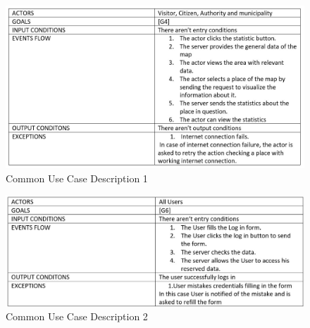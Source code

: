 \begin{figure}[h]
\centering
\includegraphics[width=\textwidth]{Images/common_use_case.png}
\caption{\label{fig:CUC}Common Use Case  Description 1} 
\end{figure}
\begin{figure}[h]
\centering
\includegraphics[width=\textwidth]{Images/common_use_case2.png}
\caption{\label{fig:CUC2}Common Use Case  Description 2}
\end{figure}
